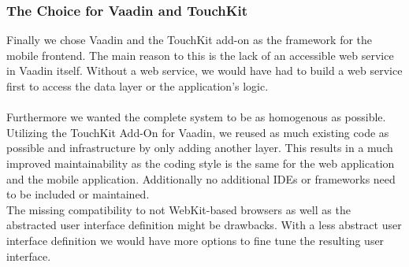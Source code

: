 \subsubsection{The Choice for Vaadin and TouchKit}
Finally we chose Vaadin and the TouchKit add-on as the framework for the mobile frontend. The main reason to this is the lack of an accessible web service in Vaadin itself. Without a web service, we would have had to build a web service first to access the data layer or the application's logic.
\\
\\
Furthermore we wanted the complete system to be as homogenous as possible.  Utilizing the TouchKit Add-On for Vaadin, we reused as much existing code as possible and infrastructure by only adding another layer. This results in a much improved maintainability as the coding style is the same for the web application and the mobile application. Additionally no additional IDEs or frameworks need to be included or maintained.
\\
The missing compatibility to not WebKit-based browsers as well as the abstracted user interface definition might be drawbacks. With a less abstract user interface definition we would have more options to fine tune the resulting user interface.

